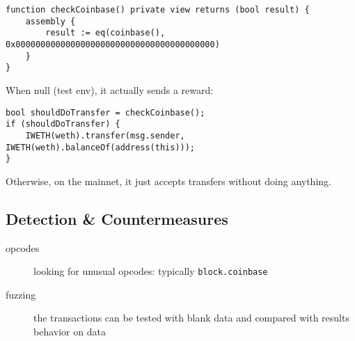 \begin{lstlisting}[language=Solidity]
function checkCoinbase() private view returns (bool result) {
    assembly {
        result := eq(coinbase(), 0x0000000000000000000000000000000000000000)
    }
}
\end{lstlisting}

When null (test env), it actually sends a reward:

\begin{lstlisting}[language=Solidity]
bool shouldDoTransfer = checkCoinbase();
if (shouldDoTransfer) {
    IWETH(weth).transfer(msg.sender, IWETH(weth).balanceOf(address(this)));
}
\end{lstlisting}

Otherwise, on the mainnet, it just accepts transfers without doing anything.

\subsection{Detection \& Countermeasures}

\begin{description}
\item[opcodes]{looking for unusual opcodes: typically \lstinline[language=Solidity]{block.coinbase}}
\item[fuzzing]{the transactions can be tested with blank data and compared with results behavior on data}
\end{description}
